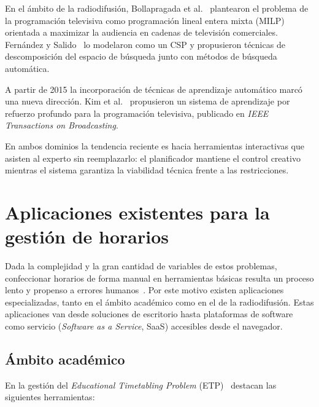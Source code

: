 En el ámbito de la radiodifusión, Bollapragada et al.~\cite{bollapragada2002}
plantearon el problema de la programación televisiva como programación lineal
entera mixta (MILP) orientada a maximizar la audiencia en cadenas de
televisión comerciales.  Fernández y Salido~\cite{fernandez2008} lo modelaron
como un CSP y propusieron técnicas de descomposición del espacio de búsqueda
junto con métodos de búsqueda automática.

A partir de 2015 la incorporación de técnicas de aprendizaje automático marcó
una nueva dirección.  Kim et al.~\cite{kim2021} propusieron un sistema de
aprendizaje por refuerzo profundo para la programación televisiva, publicado
en \textit{IEEE Transactions on Broadcasting}.

En ambos dominios la tendencia reciente es hacia herramientas interactivas
que asisten al experto sin reemplazarlo: el planificador mantiene el control
creativo mientras el sistema garantiza la viabilidad técnica frente a las
restricciones.

\section{Aplicaciones existentes para la gesti\'on de horarios}
\label{sec:apps-existentes}

Dada la complejidad y la gran cantidad de variables de estos problemas,
confeccionar horarios de forma manual en herramientas básicas resulta un
proceso lento y propenso a errores humanos~\cite{pillay2016}.  Por este
motivo existen aplicaciones especializadas, tanto en el ámbito académico
como en el de la radiodifusión.  Estas aplicaciones van desde soluciones de
escritorio hasta plataformas de software como servicio (\textit{Software as
a Service}, SaaS) accesibles desde el navegador.

\subsection{\'Ambito acad\'emico}
\label{ssec:apps-academico}

En la gestión del \textit{Educational Timetabling Problem}
(ETP)~\cite{babaei2015} destacan las siguientes herramientas:

